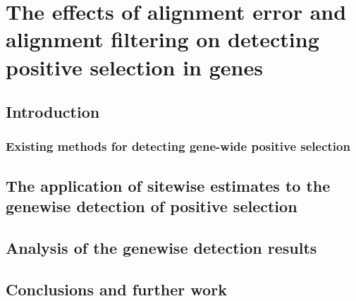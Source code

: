 \chapter{The effects of alignment error and alignment filtering on detecting positive selection in genes}

\section{Introduction}

\subsection{Existing methods for detecting gene-wide positive selection}

\section{The application of sitewise estimates to the genewise detection of positive selection}

\section{Analysis of the genewise detection results}

\section{Conclusions and further work}
